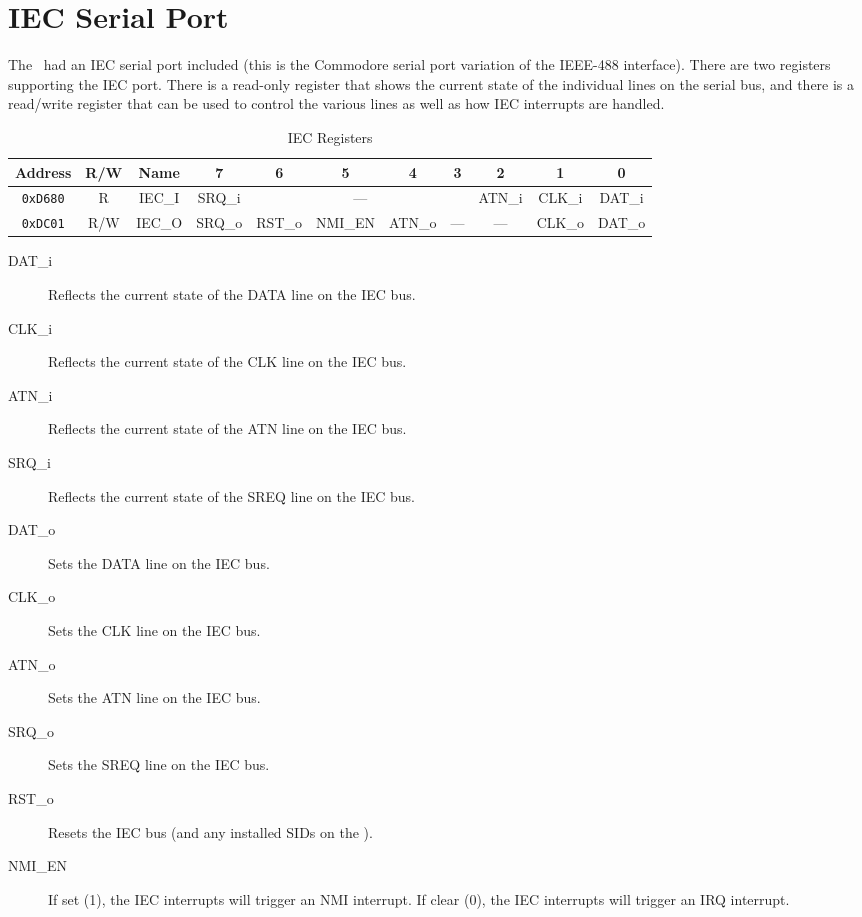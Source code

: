 \chapter{IEC Serial Port}

The \jr\ had an IEC serial port included (this is the Commodore serial port variation of the IEEE-488 interface). There are two registers supporting the IEC port. There is a read-only register that shows the current state of the individual lines on the serial bus, and there is a read/write register that can be used to control the various lines as well as how IEC interrupts are handled.

\begin{table}[h]
    \begin{center}
        \begin{tabular}{|c|c|c|c|c|c|c|c|c|c|c|} \hline
            Address & R/W & Name & 7 & 6 & 5 & 4 & 3 & 2 & 1 & 0 \\\hline\hline
            \verb+0xD680+ & R & IEC\_I & SRQ\_i & \multicolumn{4}{|c|}{---} & ATN\_i & CLK\_i & DAT\_i \\ \hline
            \verb+0xDC01+ & R/W & IEC\_O & SRQ\_o & RST\_o & NMI\_EN & ATN\_o & --- & --- & CLK\_o & DAT\_o \\ \hline
        \end{tabular}
    \end{center}
    \caption{IEC Registers}
    \label{tab:iec_reg}
\end{table}

\begin{description}
    \item[DAT\_i] Reflects the current state of the DATA line on the IEC bus. 
    \item[CLK\_i] Reflects the current state of the CLK line on the IEC bus.
    \item[ATN\_i] Reflects the current state of the ATN line on the IEC bus.
    \item[SRQ\_i] Reflects the current state of the SREQ line on the IEC bus.
    
    \item[DAT\_o] Sets the DATA line on the IEC bus. 
    \item[CLK\_o] Sets the CLK line on the IEC bus.
    \item[ATN\_o] Sets the ATN line on the IEC bus.
    \item[SRQ\_o] Sets the SREQ line on the IEC bus.
    \item[RST\_o] Resets the IEC bus (and any installed SIDs on the \fjr).
    \item[NMI\_EN] If set (1), the IEC interrupts will trigger an NMI interrupt. If clear (0), the IEC interrupts will trigger an IRQ interrupt.  
\end{description}
